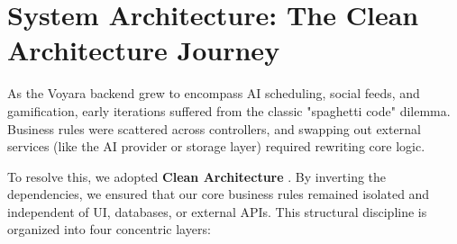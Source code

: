 \section{System Architecture: The Clean Architecture Journey}
As the Voyara backend grew to encompass AI scheduling, social feeds, and gamification, early iterations suffered from the classic "spaghetti code" dilemma. Business rules were scattered across controllers, and swapping out external services (like the AI provider or storage layer) required rewriting core logic. 

To resolve this, we adopted \textbf{Clean Architecture} \cite{cleanarchitecture}. By inverting the dependencies, we ensured that our core business rules remained isolated and independent of UI, databases, or external APIs. This structural discipline is organized into four concentric layers:

